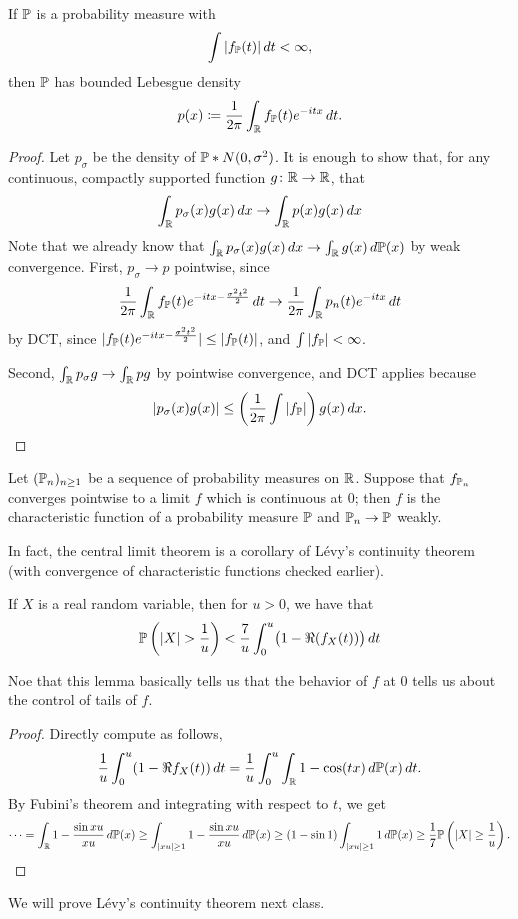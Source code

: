 \begin{theorem} \label{thm:fourier_inversion}
    If $\mathbb P$ is a probability measure with
    \[ \int \left\lvert f_\mathbb P(t) \right\rvert dt < \infty, \]
    then $\mathbb P$ has bounded Lebesgue density
    \[ p(x) \coloneq \frac{1}{2\pi} \int_\mathbb R f_\mathbb P(t) e^{-itx} \, dt. \]
\end{theorem}
\begin{proof}
    Let $p_\sigma$ be the density of $\mathbb P \ast N(0, \sigma^2)$. It is enough to show that, for any continuous, compactly supported function $g \colon \mathbb R \to \mathbb R$, that
    \[ \int_\mathbb R p_\sigma(x) g(x) \, dx \to \int_\mathbb R p(x) g(x) \, dx \]
    Note that we already know that $\int_\mathbb R p_\sigma(x) g(x) \, dx \to \int_\mathbb R g(x) \, d\mathbb P(x)$ by weak convergence. First, $p_\sigma \to p$ pointwise, since
    \[ \frac{1}{2\pi} \int_\mathbb R f_\mathbb P(t) e^{-itx - \frac{\sigma^2 t^2}{2}} \, dt \to \frac{1}{2\pi} \int_\mathbb R p_n(t) e^{-itx} \, dt \]
    by DCT, since $\lvert{f_\mathbb P(t) e^{-itx - \frac{\sigma^2 t^2}{2}}}\rvert \leq \left\lvert f_\mathbb P(t) \right\rvert$, and $\int \left\lvert f_\mathbb P \right\rvert < \infty$.

    \newpage
    Second, $\int_\mathbb R p_\sigma g \to \int_\mathbb R pg$ by pointwise convergence, and DCT applies because
    \[ \left\lvert p_\sigma(x) g(x) \right\rvert \leq \left(\frac{1}{2\pi} \int \left\lvert f_\mathbb P \right\rvert\right) g(x) \, dx. \qedhere \]
\end{proof}

\begin{theorem} \label{thm:levy_continuity_theorem}
    Let $(\mathbb P_n)_{n \geq 1}$ be a sequence of probability measures on $\mathbb R$. Suppose that $f_{\mathbb P_n}$ converges pointwise to a limit $f$ which is continuous at $0$; then $f$ is the characteristic function of a probability measure $\mathbb P$ and $\mathbb P_n \to \mathbb P$ weakly.
\end{theorem}
In fact, the central limit theorem is a corollary of L\'evy's continuity theorem (with convergence of characteristic functions checked earlier).

\begin{lemma}[Panchenko \S3.10] \label{lem:ad_hoc_bound_for_levy_cont_thm}
    If $X$ is a real random variable, then for $u > 0$, we have that
    \[ \mathbb P \left(\left\lvert X \right\rvert > \frac{1}{u}\right) < \frac{7}{u} \int_0^u \bigl(1 - \Re (f_X(t))\bigr) \, dt \]
\end{lemma}
Noe that this lemma basically tells us that the behavior of $f$ at $0$ tells us about the control of tails of $f$.

\begin{proof}
    Directly compute as follows,
    \[ \frac{1}{u} \int_0^u (1 - \Re f_X(t)) \, dt = \frac{1}{u} \int_0^u \int_\mathbb R 1 - \cos(tx) \, d\mathbb P(x) \, dt. \]
    By Fubini's theorem and integrating with respect to $t$, we get
    \[ \dots = \int_\mathbb R 1 - \frac{\sin xu}{xu} \, d\mathbb P(x) \geq \int_{\left\lvert xu \right\rvert \geq 1} 1 - \frac{\sin xu}{xu} \, d\mathbb P(x) \geq (1 - \sin 1) \int_{\left\lvert xu \right\rvert \geq 1} 1 \, d\mathbb P(x) \geq \frac{1}{7} \mathbb P\left(\left\lvert X \right\rvert \geq \frac{1}{u}\right). \qedhere \]
\end{proof}

We will prove L\'evy's continuity theorem next class.

